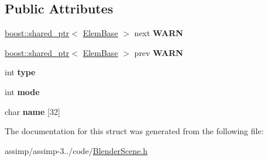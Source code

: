 \subsection*{Public Attributes}
\begin{DoxyCompactItemize}
\item 
\hypertarget{struct_assimp_1_1_blender_1_1_modifier_data_a90226528dee75aa282f3236fdfb6f52a}{\hyperlink{classboost_1_1shared__ptr}{boost\+::shared\+\_\+ptr}$<$ \hyperlink{struct_assimp_1_1_blender_1_1_elem_base}{Elem\+Base} $>$ next {\bfseries W\+A\+R\+N}}\label{struct_assimp_1_1_blender_1_1_modifier_data_a90226528dee75aa282f3236fdfb6f52a}

\item 
\hypertarget{struct_assimp_1_1_blender_1_1_modifier_data_ae84ad5dee5977193b8664de06be40db7}{\hyperlink{classboost_1_1shared__ptr}{boost\+::shared\+\_\+ptr}$<$ \hyperlink{struct_assimp_1_1_blender_1_1_elem_base}{Elem\+Base} $>$ prev {\bfseries W\+A\+R\+N}}\label{struct_assimp_1_1_blender_1_1_modifier_data_ae84ad5dee5977193b8664de06be40db7}

\item 
\hypertarget{struct_assimp_1_1_blender_1_1_modifier_data_a63e8c62ca4328a65c69ed248b64ed7b5}{int {\bfseries type}}\label{struct_assimp_1_1_blender_1_1_modifier_data_a63e8c62ca4328a65c69ed248b64ed7b5}

\item 
\hypertarget{struct_assimp_1_1_blender_1_1_modifier_data_a6df9d3dce632b011ec825c4697b4d220}{int {\bfseries mode}}\label{struct_assimp_1_1_blender_1_1_modifier_data_a6df9d3dce632b011ec825c4697b4d220}

\item 
\hypertarget{struct_assimp_1_1_blender_1_1_modifier_data_a6fbb321bfa7e89d59c813f466779d4c2}{char {\bfseries name} \mbox{[}32\mbox{]}}\label{struct_assimp_1_1_blender_1_1_modifier_data_a6fbb321bfa7e89d59c813f466779d4c2}

\end{DoxyCompactItemize}


The documentation for this struct was generated from the following file\+:\begin{DoxyCompactItemize}
\item 
assimp/assimp-\/3../code/\hyperlink{_blender_scene_8h}{Blender\+Scene.\+h}\end{DoxyCompactItemize}
